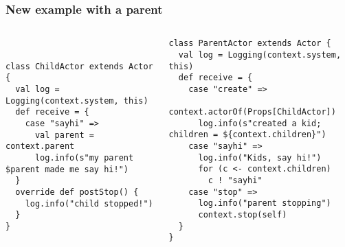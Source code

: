 \documentclass[aspectratio=169]{beamer}
\begin{document}
\begin{frame}[fragile]\frametitle{New example with a parent}

\begin{columns}
\begin{column}{0.47\textwidth}
~\\[1mm]
\centering
{}

\pause
\begin{lstlisting}[emph={Actor, Logging, Props, ourSystem,terminate,context,actorOf,receive}]
class ChildActor extends Actor {
  val log = Logging(context.system, this)
  def receive = {
    case "sayhi" =>
      val parent = context.parent
      log.info(s"my parent $parent made me say hi!")
  }
  override def postStop() {
    log.info("child stopped!")
  }
}
\end{lstlisting}
\end{column}
\begin{column}{0.54\textwidth}
\begin{lstlisting}[emph={Actor, Logging, Props, ourSystem,terminate,sleep,actorOf,receive,become,context}]
class ParentActor extends Actor {
  val log = Logging(context.system, this)
  def receive = {
    case "create" =>
      context.actorOf(Props[ChildActor])
      log.info(s"created a kid; children = ${context.children}")
    case "sayhi" =>
      log.info("Kids, say hi!")
      for (c <- context.children)
        c ! "sayhi"
    case "stop" =>
      log.info("parent stopping")
      context.stop(self)
  }
}
\end{lstlisting}
\end{column}
\end{columns}
\end{frame}
\end{document}
